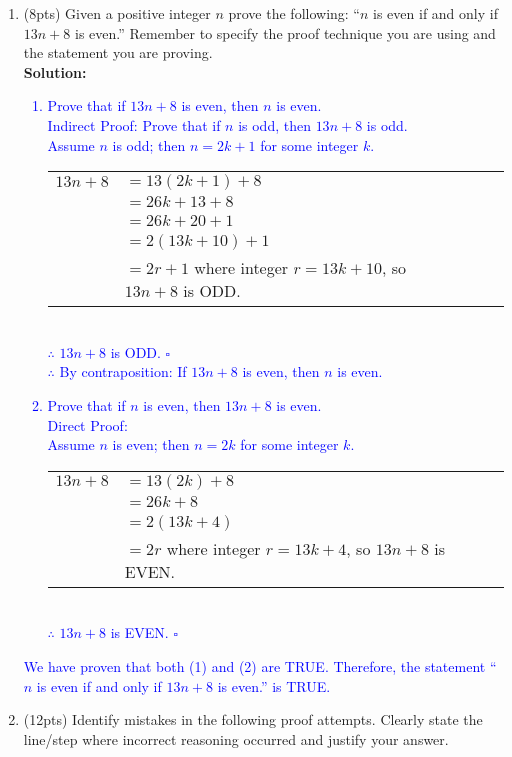 \documentclass{article}
\newcommand{\sol}[1]{\textbf{Solution:\,}\textcolor{blue}{#1}}
\begin{document}
\begin{enumerate}
\newpage

\item(8pts) Given a positive integer $n$ prove the following: ``$n$ is even if and only if $13n + 8$ is even.'' Remember to specify the proof technique you are using and the statement you are proving.
\\\sol{
\begin{enumerate}[label =(\arabic*), ref = \arabic*]
\item Prove that if $13n + 8$ is even, then $n$ is even.
\\Indirect Proof: Prove that if $n$ is odd, then $13n+8$ is odd.
\\Assume $n$ is odd; then $n=2k+1$ for some integer $k$.
\\\begin{tabular}{rlll}
$13n+8$&$=13(2k+1)+8$\\
&$=26k+13+8$\\
&$=26k+20+1$\\
&$=2(13k+10)+1$\\
&$=2r+1$ where integer $r=13k+10$, so $13n+8$ is ODD.\\
\end{tabular}
\\$\therefore$ $13n+8$ is ODD. \hfill $\square$
\\$\therefore$ By contraposition: If $13n + 8$ is even, then $n$ is even.
\item Prove that if $n$ is even, then $13n+8$ is even.
\\Direct Proof:
\\Assume $n$ is even; then $n=2k$ for some integer $k$.
\\\begin{tabular}{rlll}
$13n+8$&$=13(2k)+8$\\
&$=26k+8$\\
&$=2(13k+4)$\\
&$=2r$ \quad where integer $r=13k+4$, so $13n+8$ is EVEN.\\
\end{tabular}
\\$\therefore$ $13n+8$ is EVEN. \hfill $\square$
\end{enumerate}
We have proven that both (1) and (2) are TRUE. Therefore, the statement ``$n$ is even if and only if $13n + 8$ is even.'' is TRUE.
}

\newpage

\item(12pts) Identify mistakes in the following proof attempts. Clearly state the line/step where incorrect reasoning occurred and justify your answer.


\end{enumerate}
\end{document}
